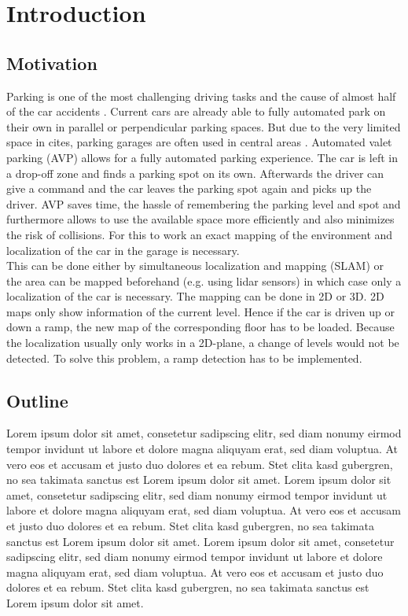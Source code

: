 \chapter{Introduction}
\label{ch:Introduction}
\section{Motivation}
Parking is one of the most challenging driving tasks and the cause of almost half of the car accidents \cite{accident}. Current cars are already able to fully automated park on their own in parallel or perpendicular parking spaces. But due to the very limited space in cites, parking garages are often used in central areas \cite{7995971}. Automated valet parking (AVP) allows for a fully automated parking experience. The car is left in a drop-off zone and finds a parking spot on its own. Afterwards the driver can give a command and the car leaves the parking spot again and picks up the driver. AVP saves time, the hassle of remembering the parking level and spot and furthermore allows to use the available space more efficiently and also minimizes the risk of collisions. For this to work an exact mapping of the environment and localization of the car in the garage is necessary.\\
This can be done either by simultaneous localization and mapping (SLAM) or the area can be mapped beforehand (e.g. using lidar sensors) in which case only a localization of the car is necessary.
The mapping can be done in 2D or 3D. 2D maps only show information of the current level. Hence if the car is driven up or down a ramp, the new map of the corresponding floor has to be loaded. Because the localization usually only works in a 2D-plane, a change of levels would not be detected. To solve this problem, a ramp detection has to be implemented.

\section{Outline}
Lorem ipsum dolor sit amet, consetetur sadipscing elitr, sed diam nonumy eirmod tempor invidunt ut labore et dolore magna aliquyam erat, sed diam voluptua.
At vero eos et accusam et justo duo dolores et ea rebum. Stet clita kasd gubergren, no sea takimata sanctus est Lorem ipsum dolor sit amet.
Lorem ipsum dolor sit amet, consetetur sadipscing elitr, sed diam nonumy eirmod tempor invidunt ut labore et dolore magna aliquyam erat, sed diam voluptua.
At vero eos et accusam et justo duo dolores et ea rebum. Stet clita kasd gubergren, no sea takimata sanctus est Lorem ipsum dolor sit amet.
Lorem ipsum dolor sit amet, consetetur sadipscing elitr, sed diam nonumy eirmod tempor invidunt ut labore et dolore magna aliquyam erat, sed diam voluptua.
At vero eos et accusam et justo duo dolores et ea rebum. Stet clita kasd gubergren, no sea takimata sanctus est Lorem ipsum dolor sit amet.